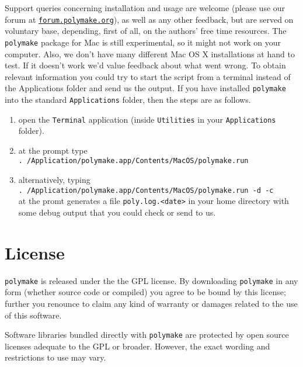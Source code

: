 \documentclass[a4paper]{amsart}
\newcommand{\polymake}{\texttt{polymake}\xspace}
\begin{document}
Support queries concerning installation and usage are welcome (please use our forum at \href{http://forum.polymake.org}{\tt forum.polymake.org}), as well as any other feedback, but are served on voluntary base, depending, first of all, on the authors' free time resources.  The \polymake package for Mac is still experimental, so it might not work on your computer. Also, we don't have many different Mac OS X installations at hand to test. If it doesn't work we'd value feedback about what went wrong. To obtain relevant information you could try to start the script from a terminal instead of the Applications folder and send us the output. If you have installed \polymake into the standard \texttt{Applications} folder, then the steps are as follows.
\begin{enumerate}
\item open the \texttt{Terminal} application (inside \texttt{Utilities} in your \texttt{Applications} folder).
\item at the prompt type\\
 \texttt{. /Application/polymake.app/Contents/MacOS/polymake.run}
\item alternatively, typing \\
 \texttt{. /Application/polymake.app/Contents/MacOS/polymake.run -d -c}\\
at the promt generates a file \texttt{poly.log.<date>} in your home directory with some debug output that you could check or send to us.
\end{enumerate}

\section*{License}

\polymake is released under the the GPL license. By downloading \polymake in any form (whether source code or compiled) you agree to be bound by this license; further you renounce to claim any kind of warranty or damages related to the use of this software.

Software libraries bundled directly with \polymake are protected by open source licenses adequate to the GPL or broader. However, the exact wording and restrictions to use may vary. 
\end{document}
